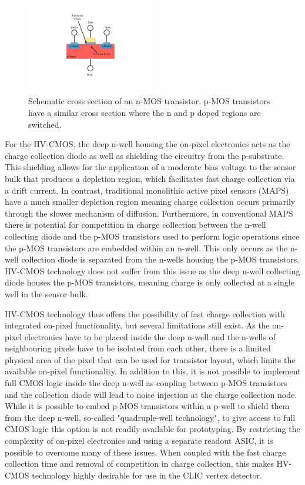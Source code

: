 \begin{figure}[h!]
\centering
\includegraphics[width=0.5\textwidth]{CLICdpVertex/Plots/FETDiagram.pdf}
\caption[Schematic cross section of an n-MOS transistor.  p-MOS transistors have a similar cross section where the n and p doped regions are switched.]{Schematic cross section of an n-MOS transistor.  p-MOS transistors have a similar cross section where the n and p doped regions are switched.}
\label{fig:nmos}
\end{figure}

For the HV-CMOS, the deep n-well housing the on-pixel electronics acts as the charge collection diode as well as shielding the circuitry from the p-substrate.  This shielding allows for the application of a moderate bias voltage to the sensor bulk that produces a depletion region, which facilitates fast charge collection via a drift current.  In contrast, traditional monolithic active pixel sensors (MAPS) have a much smaller depletion region meaning charge collection occurs primarily through the slower mechanism of diffusion.  Furthermore, in conventional MAPS there is potential for competition in charge collection between the n-well collecting diode and the p-MOS transistors used to perform logic operations since the p-MOS transistors are embedded within an n-well.  This only occurs as the n-well collection diode is separated from the n-wells housing the p-MOS transistors.  HV-CMOS technology does not suffer from this issue as the deep n-well collecting diode houses the p-MOS transistors, meaning charge is only collected at a single well in the sensor bulk.  

HV-CMOS technology thus offers the possibility of fast charge collection with integrated on-pixel functionality, but several limitations still exist.  As the on-pixel electronics have to be placed inside the deep n-well and the n-wells of neighbouring pixels have to be isolated from each other, there is a limited physical area of the pixel that can be used for transistor layout, which limits the available on-pixel functionality.  In addition to this, it is not possible to implement full CMOS logic inside the deep n-well as coupling between p-MOS transistors and the collection diode will lead to noise injection at the charge collection node.  While it is possible to embed p-MOS transistors within a p-well to shield them from the deep n-well, so-called "quadruple-well technology", to give access to full CMOS logic this option is not readily available for prototyping.  By restricting the complexity of on-pixel electronics and using a separate readout ASIC, it is possible to overcome many of these issues.  When coupled with the fast charge collection time and removal of competition in charge collection, this makes HV-CMOS technology highly desirable for use in the CLIC vertex detector.

